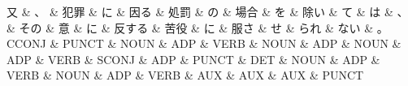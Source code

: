 \documentclass[tikz,border=5pt]{standalone}
\begin{document}
\normalsize
\begin{dependency}[edge unit distance=12.0pt]
    \begin{deptext}[column sep=1em]
        又 \& 、 \& 犯罪 \& に \& 因る \& 処罰 \& の \& 場合 \& を \& 除い \& て \& は \& 、 \& その \& 意 \& に \& 反する \& 苦役 \& に \& 服さ \& せ \& られ \& ない \& 。\\
        CCONJ \& PUNCT \& NOUN \& ADP \& VERB \& NOUN \& ADP \& NOUN \& ADP \& VERB \& SCONJ \& ADP \& PUNCT \& DET \& NOUN \& ADP \& VERB \& NOUN \& ADP \& VERB \& AUX \& AUX \& AUX \& PUNCT\\
    \end{deptext}
\end{dependency}
\end{document}

